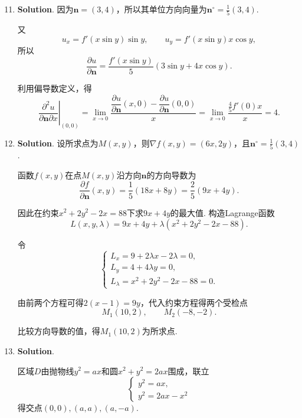 \documentclass[../Main.tex]{subfiles}
\begin{document}
\begin{enumerate}
    \setcounter{enumi}{10}

    \item \textbf{Solution}. 因为$\boldsymbol{n}=(3,4)$，所以其单位方向向量为$\boldsymbol
              {n}^{\circ}=\frac{1}{5}(3,4)$.

          又
          \[
              u_{x}=f'(x\sin y)\sin y,\qquad u_{y}=f'(x\sin y)x\cos y,
          \]
          所以
          \[
              \frac{\partial u}{\partial \boldsymbol{n}}=\frac{f'(x\sin y)}{5}(3\sin y+
              4x\cos y).
          \]

          利用偏导数定义，得
          \[
              \left.\frac{\partial^{2}u}{\partial \boldsymbol{n}\partial x}\right|_{(0,0)}
              =\lim_{x\to0}\frac{\dfrac{\partial u}{\partial \boldsymbol{n}}(x,0) -\dfrac{\partial u}{\partial \boldsymbol{n}}(0,0)}{x}
              =\lim_{x\to0}\frac{\frac{4}{5}f'(0)x}{x}=4.
          \]

    \item \textbf{Solution}. 设所求点为$M(x,y)$，则$\nabla f(x,y)=(6x,2y)$，且$\boldsymbol
              {n}^{\circ}=\frac{1}{5}(3,4)$.

          函数$f(x,y)$在点$M(x,y)$沿方向$\boldsymbol{n}$的方向导数为
          \[
              \frac{\partial f}{\partial \boldsymbol{n}}(x,y)=\frac{1}{5}(18x+8y) =\frac{2}{5}
              (9x+4y).
          \]

          因此在约束$x^{2}+2y^{2}-2x=88$下求$9x+4y$的最大值. 构造Lagrange函数
          \[
              L(x,y,\lambda)=9x+4y+\lambda(x^{2}+2y^{2}-2x-88).
          \]

          令
          \[
              \begin{cases}
                  L_{x}=9+2\lambda x-2\lambda=0, \\
                  L_{y}=4+4\lambda y=0,          \\
                  L_{\lambda}=x^{2}+2y^{2}-2x-88=0.
              \end{cases}
          \]

          由前两个方程可得$2(x-1)=9y$，代入约束方程得两个受检点
          \[
              M_{1}(10,2),\qquad M_{2}(-8,-2).
          \]

          比较方向导数的值，得$M_{1}(10,2)$为所求点.

    \item \textbf{Solution}.

          \noindent
          \begin{minipage}[c]{0.57\textwidth}
              区域$D$由抛物线$y^{2}=ax$和圆$x^{2}+y^{2}=2ax$围成，联立
              \[
                  \begin{cases}
                      y^{2}=ax, \\
                      y^{2}=2ax-x^{2}
                  \end{cases}
              \]
              得交点$(0,0),(a,a),(a,-a)$.


\end{minipage}
\end{enumerate}
\end{document}
